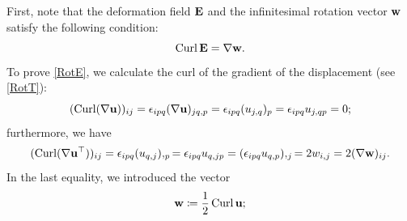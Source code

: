 First, note that the deformation field \(\mathbf{E}\) and the infinitesimal rotation vector \(\mathbf{w}\) satisfy the following condition:
\begin{equation}\label{RotE}
	\operatorname{Curl} \mathbf{E} = \nabla \mathbf{w}.
\end{equation}
To prove \eqref{RotE}, we calculate the curl of the gradient of the displacement (see \eqref{RotT}):
\begin{equation}
	(\operatorname{Curl}(\nabla \mathbf{u}))_{ij} = \epsilon_{ipq} (\nabla \mathbf{u})_{jq,p} = \epsilon_{ipq} (u_{j,q})_p = \epsilon_{ipq} u_{j,qp} = 0;
\end{equation}
furthermore, we have
\begin{equation}
	(\operatorname{Curl}(\nabla \mathbf{u}^\top))_{ij} = \epsilon_{ipq} (u_{q,j}),_p = \epsilon_{ipq} u_{q,jp} = (\epsilon_{ipq} u_{q,p}),_j = 2 w_{i,j} = 2 (\nabla \mathbf{w})_{ij}.
\end{equation}
In the last equality, we introduced the vector
\begin{equation}
	\mathbf{w} \coloneqq \frac{1}{2} \operatorname{Curl} \mathbf{u};
\end{equation}
